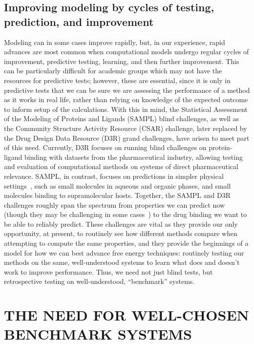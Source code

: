 \documentclass[aps,pre,twocolumn,nofootinbib,superscriptaddress,10pt, final,tightenlines]{revtex4-1}
\begin{document}
\subsection{Improving modeling by cycles of testing, prediction, and improvement}
Modeling can in some cases improve rapidly, but, in our experience, rapid advances are most common when computational models undergo regular cycles of improvement, predictive testing, learning, and then further improvement.
This can be particularly difficult for academic groups which may not have the resources for predictive tests; however, these are essential, since it is only in predictive tests that we can be sure we are assessing the performance of a method as it works in real life, rather than relying on knowledge of the expected outcome to inform setup of the calculations.
With this in mind, the Statistical Assessment of the Modeling of Proteins and Ligands (SAMPL) blind challenges, as well as the Community Structure Activity Resource (CSAR) challenge, later replaced by the Drug Design Data Resource (D3R) grand challenges, have arisen to meet part of this need. 
Currently, D3R focuses on running blind challenges on protein-ligand binding with datasets from the pharmaceutical industry, allowing testing and evaluation of computational methods on systems of direct pharmaceutical relevance.
SAMPL, in contrast, focuses on predictions in simpler physical settings~\cite{Mobley:2016:}, such as small molecules in aqueous and organic phases, and small molecules binding to supramolecular hosts.
Together, the SAMPL and D3R challenges roughly span the spectrum from properties we can predict now (though they may be challenging in some cases~\cite{bannan_blind_2016, yin_overview_2016, Mobley:2016:}) to the drug binding we want to be able to reliably predict. 
These challenges are vital as they provide our only opportunity, at present, to routinely see how different methods compare when attempting to compute the same properties, and they provide the beginnings of a model for how we can best advance free energy techniques: routinely testing our methods on the same, well-understood systems to learn what does and doesn't work to improve performance. 
Thus, we need not just blind tests, but retrospective testing on well-understood, ``benchmark'' systems.


\section{THE NEED FOR WELL-CHOSEN BENCHMARK SYSTEMS}
\end{document}
